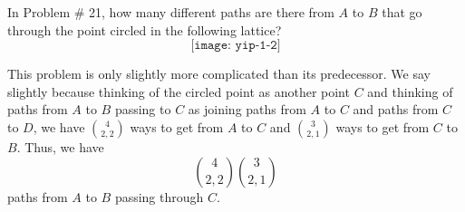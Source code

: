 \begin{problem}[Ross, \S 1, \# 22]
  In Problem \# 21, how many different paths are there from \(A\) to \(B\)
  that go through the point circled in the following lattice?
  \[
    \texttt{[image: yip-1-2]}
  \]
\end{problem}
\begin{solution*}
  This problem is only slightly more complicated than its predecessor. We
  say slightly because thinking of the circled point as another point \(C\)
  and thinking of paths from \(A\) to \(B\) passing to \(C\) as joining
  paths from \(A\) to \(C\) and paths from \(C\) to \(D\), we have
  \(\binom{4}{2,2}\) ways to get from \(A\) to \(C\) and \(\binom{3}{2,1}\)
  ways to get from \(C\) to \(B\). Thus, we have
  \[
    \binom{4}{2,2}\binom{3}{2,1}
  \]
  paths from \(A\) to \(B\) passing through \(C\).
\end{solution*}

